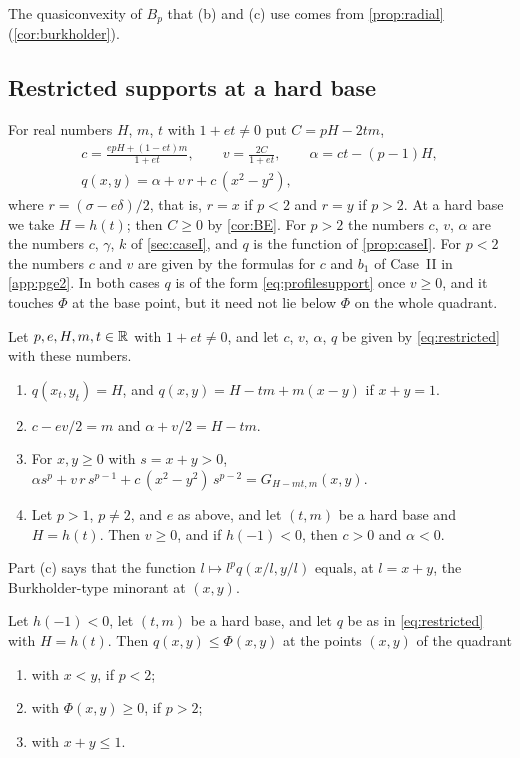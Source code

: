 The quasiconvexity of $B_p$ that (b) and (c) use comes from \cref{prop:radial}
(\cref{cor:burkholder}).

\subsection{Restricted supports at a hard base}\label{sec:restricted}

For real numbers $H$, $m$, $t$ with $1+et\ne0$ put $C=pH-2tm$,
\begin{equation}\label{eq:restricted}
\begin{gathered}
  c=\frac{epH+(1-et)m}{1+et},\qquad v=\frac{2C}{1+et},\qquad\alpha=ct-(p-1)H,\\
  q(x,y)=\alpha+v\,r+c\,(x^2-y^2),
\end{gathered}
\end{equation}
where $r=(\sigma-e\delta)/2$, that is, $r=x$ if $p<2$ and $r=y$ if $p>2$. At a hard base we take
$H=h(t)$; then $C\ge0$ by \cref{cor:BE}. For $p>2$ the numbers $c$, $v$, $\alpha$ are the
numbers $c$, $\gamma$, $k$ of \cref{sec:caseI}, and $q$ is the function of \cref{prop:caseI}.
For $p<2$ the numbers $c$ and $v$ are given by the formulas for $c$ and $b_1$ of Case~II in
\cref{app:pge2}. In both cases $q$ is of the form
\eqref{eq:profilesupport} once $v\ge0$, and it touches $\Phi$ at the base point, but it need not
lie below $\Phi$ on the whole quadrant.

\begin{lemma}\label{lem:rs-identities}
Let $p,e,H,m,t\in\mathbb{R}$ with $1+et\ne0$, and let $c$, $v$, $\alpha$, $q$ be given by
\eqref{eq:restricted} with these numbers.
\begin{enumerate}[label=\textup{(\alph*)}]
\item $q(x_t,y_t)=H$, and $q(x,y)=H-tm+m(x-y)$ if $x+y=1$.
\item $c-ev/2=m$ and $\alpha+v/2=H-tm$.
\item For $x,y\ge0$ with $s=x+y>0$,
  $\alpha s^p+v\,r\,s^{p-1}+c\,(x^2-y^2)\,s^{p-2}=G_{H-mt,m}(x,y)$.
\item Let $p>1$, $p\ne2$, and $e$ as above, and let $(t,m)$ be a hard base and $H=h(t)$. Then
  $v\ge0$, and if $h(-1)<0$, then $c>0$ and $\alpha<0$.
\end{enumerate}
\end{lemma}

Part (c) says that the function $l\mapsto l^pq(x/l,y/l)$ equals, at $l=x+y$, the Burkholder-type
minorant at $(x,y)$.

\begin{proposition}\label{prop:restricted}
Let $h(-1)<0$, let $(t,m)$ be a hard base, and let $q$ be as in \eqref{eq:restricted} with
$H=h(t)$. Then $q(x,y)\le\Phi(x,y)$ at the points $(x,y)$ of the quadrant
\begin{enumerate}[label=\textup{(\alph*)}]
\item with $x<y$, if $p<2$;
\item with $\Phi(x,y)\ge0$, if $p>2$;
\item with $x+y\le1$.
\end{enumerate}
\end{proposition}

